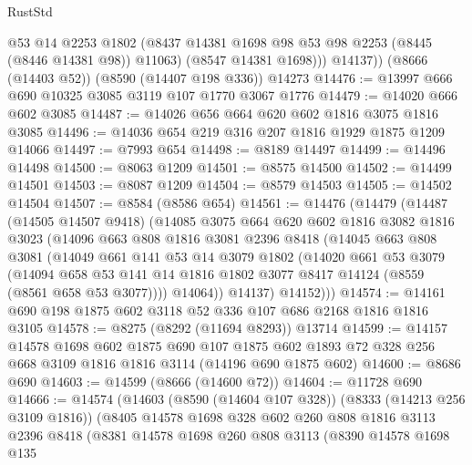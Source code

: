 \begin{lexlean}{RustStd}
\begin{coremodule}
            @53
            @14
            @2253
            @1802
            (@8437 @14381 @1698 @98 @53 @98 @2253 (@8445 (@8446 @14381 @98)) @11063)
            (@8547 @14381 @1698)))
        @14137))
    (@8666 (@14403 @52))
    (@8590 (@14407 @198 @336))
    @14273
@14476 := @13997 @666 @690 @10325 @3085 @3119 @107 @1770 @3067 @1776
@14479 := @14020 @666 @602 @3085
@14487 := @14026 @656 @664 @620 @602 @1816 @3075 @1816 @3085
@14496 := @14036 @654 @219 @316 @207 @1816 @1929 @1875 @1209 @14066
@14497 := @7993 @654
@14498 := @8189 @14497
@14499 := @14496 @14498
@14500 := @8063 @1209
@14501 := @8575 @14500
@14502 := @14499 @14501
@14503 := @8087 @1209
@14504 := @8579 @14503
@14505 := @14502 @14504
@14507 := @8584 (@8586 @654)
@14561 := @14476
    (@14479
      (@14487
        (@14505 @14507 @9418)
        (@14085
          @3075
          @664
          @620
          @602
          @1816
          @3082
          @1816
          @3023
          (@14096
            @663
            @808
            @1816
            @3081
            @2396
            @8418
            (@14045
              @663
              @808
              @3081
              (@14049
                @661
                @141
                @53
                @14
                @3079
                @1802
                (@14020
                  @661
                  @53
                  @3079
                  (@14094
                    @658
                    @53
                    @141
                    @14
                    @1816
                    @1802
                    @3077
                    @8417
                    @14124
                    (@8559 (@8561 @658 @53 @3077))))
                @14064))
            @14137)
          @14152)))
@14574 := @14161 @690 @198 @1875 @602 @3118 @52 @336 @107 @686 @2168 @1816 @1816 @3105
@14578 := @8275 (@8292 (@11694 @8293)) @13714
@14599 := @14157
    @14578
    @1698
    @602
    @1875
    @690
    @107
    @1875
    @602
    @1893
    @72
    @328
    @256
    @668
    @3109
    @1816
    @1816
    @3114
    (@14196 @690 @1875 @602)
@14600 := @8686 @690
@14603 := @14599 (@8666 (@14600 @72))
@14604 := @11728 @690
@14666 := @14574
    (@14603
      (@8590 (@14604 @107 @328))
      (@8333 (@14213 @256 @3109 @1816))
      (@8405
        @14578
        @1698
        @328
        @602
        @260
        @808
        @1816
        @3113
        @2396
        @8418
        (@8381
          @14578
          @1698
          @260
          @808
          @3113
          (@8390
            @14578
            @1698
            @135

\end{coremodule}
\end{lexlean}
